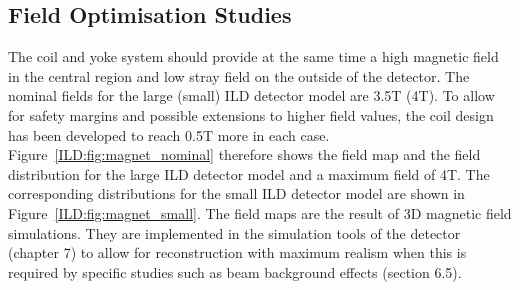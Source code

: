 \subsection{Field Optimisation Studies}

The coil and yoke system should provide at the same time a high magnetic field in the central region and low stray field on the outside of the detector. The nominal fields for the large (small) ILD detector model are 3.5T (4T). To allow for safety margins and possible extensions to higher field values, the coil design has been developed to reach 0.5T more in each case. Figure~\ref{ILD:fig:magnet_nominal} therefore shows the field map and the field distribution for the large ILD detector model and a maximum field of 4T. The corresponding distributions for the small ILD detector model are shown in Figure~\ref{ILD:fig:magnet_small}. The field maps are the result of 3D magnetic field simulations. They are implemented in the simulation tools of the detector (chapter 7) to allow for reconstruction with maximum realism when this is required by specific studies such as beam background effects (section 6.5). 

